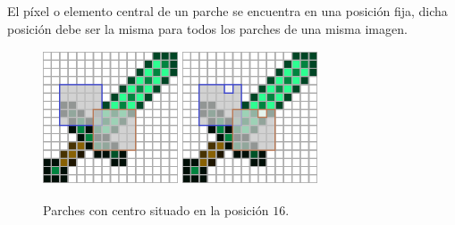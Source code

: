 \begin{definition}
	El p\'ixel o elemento central de un parche se encuentra en una posici\'on fija, dicha posici\'on debe ser la misma para todos los parches de una misma imagen.
\end{definition}

\begin{figure}[h]
	\centering
	\includegraphics[width=4cm, height=4cm]{Graphics/diamon_sword_with_patches.png}
	\hspace{1cm}
	\includegraphics[width=4cm, height=4cm]{Graphics/diamon_sword_with_patches_and_centers.png}
	\caption{Parches con centro situado en la posici\'on $16$.}
\end{figure}

%	


